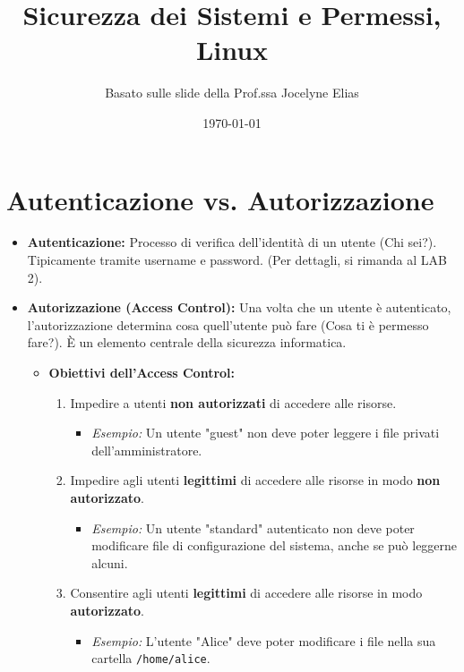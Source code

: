 

\title{Sicurezza dei Sistemi e Permessi, Linux}
\author{Basato sulle slide della Prof.ssa Jocelyne Elias}
\date{\today}



\maketitle
\tableofcontents
\newpage

\section{Autenticazione vs. Autorizzazione}
\begin{itemize}
    \item \textbf{Autenticazione:} Processo di verifica dell'identità di un utente (Chi sei?). Tipicamente tramite username e password. (Per dettagli, si rimanda al LAB 2).
    \item \textbf{Autorizzazione (Access Control):} Una volta che un utente è autenticato, l'autorizzazione determina cosa quell'utente può fare (Cosa ti è permesso fare?). È un elemento centrale della sicurezza informatica.
    \begin{itemize}
        \item \textbf{Obiettivi dell'Access Control:}
        \begin{enumerate}
            \item Impedire a utenti \textbf{non autorizzati} di accedere alle risorse.
            \begin{itemize}
                \item \textit{Esempio:} Un utente "guest" non deve poter leggere i file privati dell'amministratore.
            \end{itemize}
            \item Impedire agli utenti \textbf{legittimi} di accedere alle risorse in modo \textbf{non autorizzato}.
            \begin{itemize}
                \item \textit{Esempio:} Un utente "standard" autenticato non deve poter modificare file di configurazione del sistema, anche se può leggerne alcuni.
            \end{itemize}
            \item Consentire agli utenti \textbf{legittimi} di accedere alle risorse in modo \textbf{autorizzato}.
            \begin{itemize}
                \item \textit{Esempio:} L'utente "Alice" deve poter modificare i file nella sua cartella \texttt{/home/alice}.
            \end{itemize}
        \end{enumerate}
    \end{itemize}
\end{itemize}

